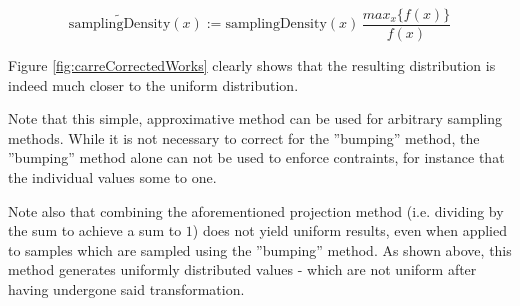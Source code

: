\[
\tilde{\text{samplingDensity}}(x) := \text{samplingDensity}(x) \, \frac{max_x\{ f(x) \}}{f(x)}
\]

Figure \ref{fig:carreCorrectedWorks} clearly shows that the resulting distribution is indeed much closer to the uniform distribution. 


Note that this simple, approximative method can be used for arbitrary sampling methods. While it is not necessary to correct for the ''bumping'' method, the ''bumping'' method alone can not be used to enforce contraints, for instance that the individual values some to one. 

Note also that combining the aforementioned projection method (i.e. dividing by the sum to achieve a sum to $1$) does not yield uniform results, even when applied to samples which are sampled using the ''bumping'' method. As shown above, this method generates uniformly distributed values - which are not uniform after having undergone said transformation. 

